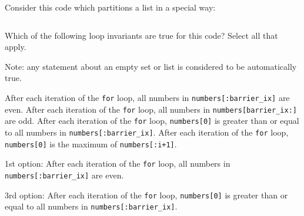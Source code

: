\begin{prob}
    Consider this code which partitions a list in a special way:

    \inputminted[lastline=15]{python}{code.py}

    Which of the following loop invariants are true for this code? Select all
    that apply.

    Note: any statement about an empty set or list is considered to be automatically true.

    \begin{choices}[rectangle]
        \correctchoice After each iteration of the \texttt{for} loop, all numbers in
            \texttt{numbers[:barrier_ix]} are even.
        \choice After each iteration of the \texttt{for} loop, all numbers in
            \texttt{numbers[barrier_ix:]} are odd.
        \correctchoice After each iteration of the \texttt{for} loop,
            \texttt{numbers[0]} is greater than or equal to all numbers in
            \texttt{numbers[:barrier_ix]}.
        \choice After each iteration of the \texttt{for} loop,
            \texttt{numbers[0]} is the maximum of \texttt{numbers[:i+1]}.
    \end{choices}

    \begin{soln}
        1st option: After each iteration of the \texttt{for} loop, all numbers in
            \texttt{numbers[:barrier_ix]} are even.

        3rd option: After each iteration of the \texttt{for} loop,
        \texttt{numbers[0]} is greater than or equal to all numbers in
        \texttt{numbers[:barrier_ix]}.
    \end{soln}

\end{prob}
